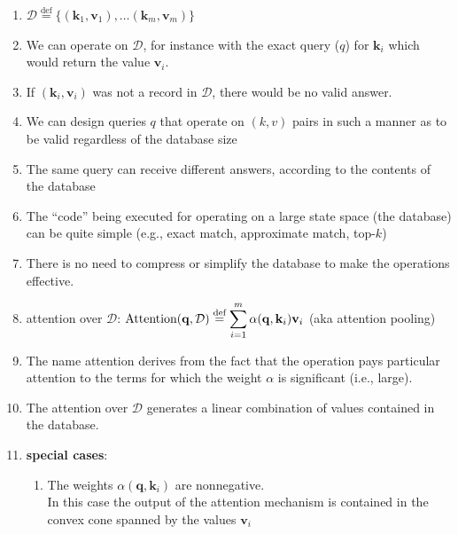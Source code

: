 \begin{enumerate}[itemsep=0.15cm]
    \item $\mathcal{D} \stackrel{\textrm{def}}{=} \{(\mathbf{k}_1, \mathbf{v}_1), \ldots (\mathbf{k}_m, \mathbf{v}_m)\}$

    \item We can operate on $\mathcal{D}$, for instance with the exact query ($q$) for $\mathbf{k}_i$ which would return the value $\mathbf{v}_i$. 
    
    \item If $(\mathbf{k}_i, \mathbf{v}_i)$ was not a record in $\mathcal{D}$, there would be no valid answer.

    \item We can design queries $q$ that operate on $(k,v)$ pairs in such a manner as to be valid regardless of the database size

    \item The same query can receive different answers, according to the contents of the database

    \item The “code” being executed for operating on a large state space (the database) can be quite simple (e.g., exact match, approximate match, top-$k$)

    \item There is no need to compress or simplify the database to make the operations effective.

    \item attention over $\mathcal{D}$: $\textrm{Attention}(\mathbf{q}, \mathcal{D}) \stackrel{\textrm{def}}{=} \displaystyle\sum_{i=1}^m \alpha(\mathbf{q}, \mathbf{k}_i) \mathbf{v}_i$
    \hfill
    (aka attention pooling)

    \item The name attention derives from the fact that the operation pays particular attention to the terms for which the weight $\alpha$ is significant (i.e., large). 
    
    \item The attention over $\mathcal{D}$ generates a linear combination of values contained in the database.

    \item \textbf{special cases}:
    \begin{enumerate}[itemsep=0.1cm]
        \item The weights $\alpha(\mathbf{q}, \mathbf{k}_i)$ are nonnegative.\\
        In this case the output of the attention mechanism is contained in the convex cone spanned by the values $\mathbf{v}_i$


\end{enumerate}
\end{enumerate}
